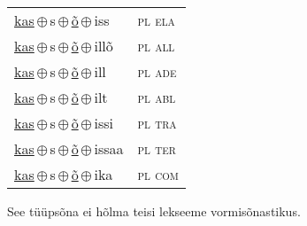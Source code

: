\begin{minipage}{\textwidth}
\begin{sideways}
\begin{tabular}{l l}
\underline{kas}\,$\oplus$\,s\,$\oplus$\,\underline{õ}\,$\oplus$\,iss & \textsc{ pl ela } \\
\underline{kas}\,$\oplus$\,s\,$\oplus$\,\underline{õ}\,$\oplus$\,illõ & \textsc{ pl all } \\
\underline{kas}\,$\oplus$\,s\,$\oplus$\,\underline{õ}\,$\oplus$\,ill & \textsc{ pl ade } \\
\underline{kas}\,$\oplus$\,s\,$\oplus$\,\underline{õ}\,$\oplus$\,ilt & \textsc{ pl abl } \\
\underline{kas}\,$\oplus$\,s\,$\oplus$\,\underline{õ}\,$\oplus$\,issi & \textsc{ pl tra } \\
\underline{kas}\,$\oplus$\,s\,$\oplus$\,\underline{õ}\,$\oplus$\,issaa & \textsc{ pl ter } \\
\underline{kas}\,$\oplus$\,s\,$\oplus$\,\underline{õ}\,$\oplus$\,ika & \textsc{ pl com } \\
\end{tabular}
\end{sideways}
\label{tab:tüüpsõnamall-kasõ}

\end{minipage}

 
\vspace{1em}
\noindent See tüüpsõna ei hõlma teisi lekseeme vormi\-sõnastikus.
